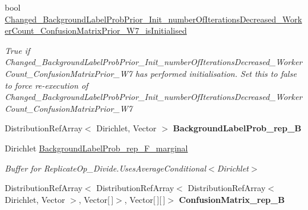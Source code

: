 \begin{DoxyCompactItemize}
bool \hyperlink{class_microsoft_research_1_1_infer_1_1_models_1_1_user_1_1_model___e_p_a2e04d5d41ac542942b2b715e26bd4038}{Changed\+\_\+\+Background\+Label\+Prob\+Prior\+\_\+\+Init\+\_\+number\+Of\+Iterations\+Decreased\+\_\+\+Worker\+Count\+\_\+\+Confusion\+Matrix\+Prior\+\_\+\+W7\+\_\+is\+Initialised}
\begin{DoxyCompactList}\small\item\em True if Changed\+\_\+\+Background\+Label\+Prob\+Prior\+\_\+\+Init\+\_\+number\+Of\+Iterations\+Decreased\+\_\+\+Worker\+Count\+\_\+\+Confusion\+Matrix\+Prior\+\_\+\+W7 has performed initialisation. Set this to false to force re-\/execution of Changed\+\_\+\+Background\+Label\+Prob\+Prior\+\_\+\+Init\+\_\+number\+Of\+Iterations\+Decreased\+\_\+\+Worker\+Count\+\_\+\+Confusion\+Matrix\+Prior\+\_\+\+W7\end{DoxyCompactList}\item 
\hypertarget{class_microsoft_research_1_1_infer_1_1_models_1_1_user_1_1_model___e_p_aae95c2a5d450ae29e8296fef01dd762c}{}Distribution\+Ref\+Array$<$ Dirichlet, Vector $>$ {\bfseries Background\+Label\+Prob\+\_\+rep\+\_\+\+B}\label{class_microsoft_research_1_1_infer_1_1_models_1_1_user_1_1_model___e_p_aae95c2a5d450ae29e8296fef01dd762c}

\item 
Dirichlet \hyperlink{class_microsoft_research_1_1_infer_1_1_models_1_1_user_1_1_model___e_p_ada4c5df5755a4a5d434327e99fc0e52e}{Background\+Label\+Prob\+\_\+rep\+\_\+\+F\+\_\+marginal}
\begin{DoxyCompactList}\small\item\em Buffer for Replicate\+Op\+\_\+\+Divide.\+Uses\+Average\+Conditional$<$\+Dirichlet$>$\end{DoxyCompactList}\item 
\hypertarget{class_microsoft_research_1_1_infer_1_1_models_1_1_user_1_1_model___e_p_a23af40d289a65eda2de8c88cbbec3ff5}{}Distribution\+Ref\+Array$<$ Distribution\+Ref\+Array$<$ Distribution\+Ref\+Array$<$ Dirichlet, Vector $>$, Vector\mbox{[}$\,$\mbox{]}$>$, Vector\mbox{[}$\,$\mbox{]}\mbox{[}$\,$\mbox{]}$>$ {\bfseries Confusion\+Matrix\+\_\+rep\+\_\+\+B}\label{class_microsoft_research_1_1_infer_1_1_models_1_1_user_1_1_model___e_p_a23af40d289a65eda2de8c88cbbec3ff5}


\end{DoxyCompactItemize}
